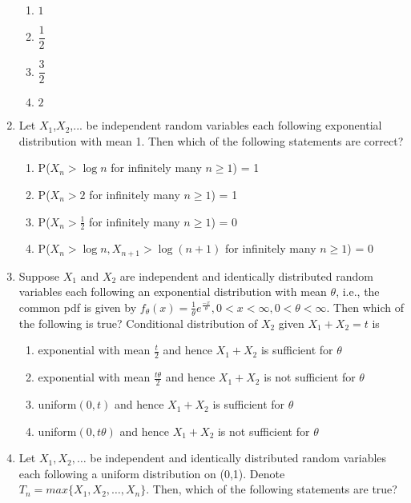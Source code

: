 \begin{enumerate}[label=\thesection.\arabic*.,ref=\thesection.\theenumi]
\begin{enumerate}[label=\Alph*)]
    \item $1$\\[0.5pt]
    \item $\dfrac{1}{2}$\\
    \item $\dfrac{3}{2}$\\
    \item $2$
\end{enumerate}
%
\solution

%
\item Let $X_1$,$X_2$,... be independent random variables each following exponential distribution with mean 1. Then which of the following statements are correct?
\begin{enumerate}
    \item P($X_n > \log n$ for infinitely many $n \geq 1$) = 1
    \item P($X_n > 2$ for infinitely many $n \geq 1$) = 1
    \item P($X_n > \frac{1}{2}$ for infinitely many $n \geq 1$) = 0
    \item P($X_n > \log n, X_{n+1}>\log (n+1)$ for infinitely many $n \geq 1$) = 0
\end{enumerate}
%
\solution

%
\item Suppose $X_1$ and $X_2$ are independent and identically distributed random variables each following an exponential distribution with mean $\theta$, i.e., the common pdf is given by $f_\theta(x) = \frac{1}{\theta}e^{\frac{-x}{\theta}}, 0<x<\infty,0<\theta<\infty.$ Then which of the following is true? Conditional distribution of $X_2$ given $X_1+X_2=t$ is 
\begin{enumerate}
    \item exponential with mean $\frac{t}{2}$ and hence $X_1+X_2$ is sufficient for $\theta$ \label{june/2013/40/option 1}
    \item exponential with mean $\frac{t\theta}{2}$ and hence $X_1+X_2$ is not sufficient for $\theta$ \label{june/2013/40/option 2}
    \item uniform$(0,t)$ and hence $X_1+X_2$ is sufficient for $\theta$ \label{june/2013/40/option 3}
    \item uniform$(0,t\theta)$ and hence $X_1+X_2$ is not sufficient for $\theta$ \label{june/2013/40/option 4}
\end{enumerate}
%
\solution

%
\item Let $X_{1},X_{2},\dots$ be independent and identically distributed random variables each following a uniform distribution on (0,1). Denote $T_{n}=max\{ X_{1},X_{2},\dots,X_{n}\}$. Then, which of the following statements are true?

\end{enumerate}
